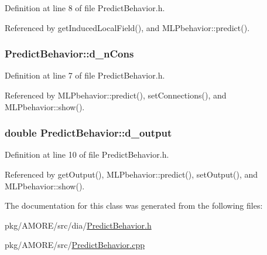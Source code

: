 Definition at line 8 of file PredictBehavior.h.



Referenced by getInducedLocalField(), and MLPbehavior::predict().

\hypertarget{class_predict_behavior_ae7d8e531771e06a855f4f1ade167f2f3}{
\subsubsection[{d\_\-nCons}]{ {\bf PredictBehavior::d\_\-nCons}}}
\label{class_predict_behavior_ae7d8e531771e06a855f4f1ade167f2f3}


Definition at line 7 of file PredictBehavior.h.



Referenced by MLPbehavior::predict(), setConnections(), and MLPbehavior::show().

\hypertarget{class_predict_behavior_acae2a69a47c0af627fc17b9243148db2}{
\subsubsection[{d\_\-output}]{\setlength{\rightskip}{0pt plus 5cm}double {\bf PredictBehavior::d\_\-output}}}
\label{class_predict_behavior_acae2a69a47c0af627fc17b9243148db2}


Definition at line 10 of file PredictBehavior.h.



Referenced by getOutput(), MLPbehavior::predict(), setOutput(), and MLPbehavior::show().



The documentation for this class was generated from the following files:\begin{DoxyCompactItemize}
\item 
pkg/AMORE/src/dia/\hyperlink{_predict_behavior_8h}{PredictBehavior.h}\item 
pkg/AMORE/src/\hyperlink{_predict_behavior_8cpp}{PredictBehavior.cpp}\end{DoxyCompactItemize}
